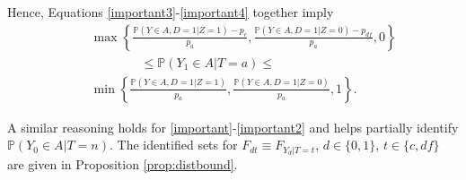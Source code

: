 \documentclass[12pt]{article}
\theoremstyle{plain}
\theoremstyle{definition}
\theoremstyle{remark}
\begin{document}
   Hence, Equations \eqref{important3}-\eqref{important4} together imply 
   \begin{eqnarray}
   && \max\left\{\frac{\mathbb P(Y\in A, D=1 \vert Z=1)- p_{c}}{p_a}, \frac{\mathbb P(Y\in A, D=1 \vert Z=0)- p_{df}}{p_a},0\right\}\nonumber\\
   && \qquad \qquad \leq \mathbb P(Y_1 \in A \vert T=a) \leq \label{eq:func}\\
   && \min\left\{\frac{\mathbb P(Y\in A, D=1 \vert Z=1)}{p_a}, \frac{\mathbb P(Y\in A, D=1 \vert Z=0)}{p_a},1\right\}. \nonumber  
   \end{eqnarray}

A similar reasoning holds for \eqref{important}-\eqref{important2} and helps partially identify $\mathbb P(Y_0 \in A \vert T=n)$. The identified sets for $F_{dt}\equiv F_{Y_d\vert T=t}$, $d\in\{0,1\}$, $t\in \{c,df\}$ are given in Proposition \ref{prop:distbound}.
\end{document}
